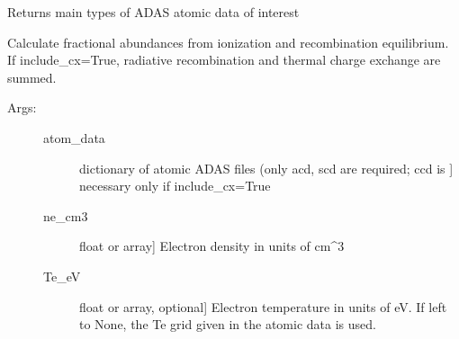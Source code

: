 \documentclass[letterpaper,10pt,english]{sphinxmanual}
\begin{document}

\begin{fulllineitems}
\label{\detokenize{aurora:aurora.atomic.get_file_types}}
Returns main types of ADAS atomic data of interest

\end{fulllineitems}


\begin{fulllineitems}
\label{\detokenize{aurora:aurora.atomic.get_frac_abundances}}
Calculate fractional abundances from ionization and recombination equilibrium.
If include\_cx=True, radiative recombination and thermal charge exchange are summed.
\begin{description}
\item[{Args:}] \leavevmode\begin{description}
\item[{atom\_data}] \leavevmode{[}dictionary of atomic ADAS files (only acd, scd are required; ccd is {]}
necessary only if include\_cx=True

\item[{ne\_cm3}] \leavevmode{[}float or array{]}
Electron density in units of cm\textasciicircum{}\sphinxhyphen{}3

\item[{Te\_eV}] \leavevmode{[}float or array, optional{]}
Electron temperature in units of eV. If left to None, the Te grid given in the 
atomic data is used.


\end{description}
\end{description}
\end{fulllineitems}
\end{document}
